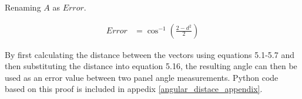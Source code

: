 \noindent Renaming $A$ as $Error$.

\begin{align}
	Error &= \cos^{-1}(\frac{2-d^2}{2}) \label{errorangle}
\end{align}


\noindent By first calculating the distance between the vectors using equations 5.1-5.7 and then substituting the distance into equation 5.16, the resulting angle can then be used as an error value between two panel angle measurements. Python code based on this proof is included in appedix \ref{angular_distace_appendix}.




\vspace{5mm}





\newpage
